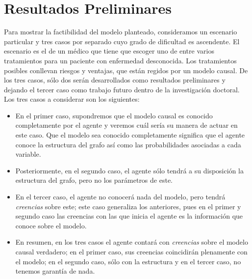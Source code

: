 \documentclass[11pt]{article}
\theoremstyle{plain}
\begin{document}
\section{Resultados Preliminares}{\label{resultados}}
Para mostrar la factibilidad del modelo planteado, consideramos un escenario particular y tres casos por separado cuyo grado de dificultad es ascendente. El escenario es el de un médico que tiene que escoger uno de entre varios tratamientos para un paciente con enfermedad desconocida. Los tratamientos posibles conllevan riesgos y ventajas, que están regidos por un modelo causal. De los tres casos, sólo dos serán desarrollados como resultados preliminares y dejando el tercer caso como trabajo futuro dentro de la investigación doctoral. Los tres casos a considerar son los siguientes:
\begin{itemize}
\item En el primer caso, supondremos que el modelo causal es conocido completamente por el agente y veremos cuál sería su manera de actuar en este caso. Que el modelo sea conocido completamente significa que el agente conoce la estructura del grafo así como las probabilidades asociadas a cada variable.
\item Posteriormente, en el segundo caso, el agente sólo tendrá a su disposición la estructura del grafo, pero no los parámetros de este. 
\item En el tercer caso, el agente no conocerá nada del modelo, pero tendrá \textit{creencias} sobre este; este caso generaliza los anteriores, pues en el primer y segundo caso las creencias con las que inicia el agente es la información que conoce sobre el modelo.
\item  En resumen, en los tres casos el agente contará con \textit{creencias} sobre el modelo causal verdadero; en el primer caso, sus creencias coincidirán plenamente con el modelo; en el segundo caso, sólo con la estructura y en el tercer caso, no tenemos garantía de nada. 
\end{itemize}
\end{document}
